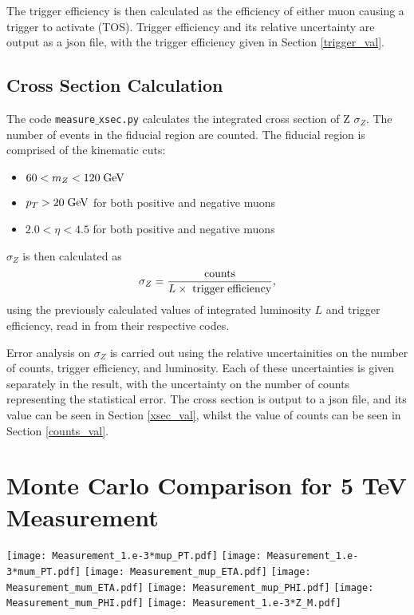 \documentclass[a4paper]{article}
\begin{document}
The trigger efficiency is then calculated as the efficiency of either muon causing a trigger to activate (TOS).
Trigger efficiency and its relative uncertainty are output as a json file, with the trigger efficiency given in Section \ref{trigger_val}.

\subsection{Cross Section Calculation}
The code \texttt{measure$\_$xsec.py} calculates the integrated cross section of Z $\sigma_Z$.
The number of events in the fiducial region are counted. The fiducial region is comprised of the kinematic cuts:

\begin{itemize}
  \item $60 < m_Z < 120 \; {\rm GeV}$ 
  \item $p_T > 20 \; {\rm GeV}$ for both positive and negative muons
  \item $2.0 < \eta < 4.5$ for both positive and negative muons
\end{itemize}

$\sigma_Z$ is then calculated as
\begin{equation}
\sigma_Z = \frac{{\rm counts}}{L \times {\rm \; trigger \; efficiency}},
\end{equation}
using the previously calculated values of integrated luminosity $L$ and trigger efficiency, read in from their respective codes.

Error analysis on $\sigma_Z$ is carried out using the relative uncertainities on the number of counts, trigger efficiency, and luminosity. Each of these uncertainties is given separately in the result, with the uncertainty on the number of counts representing the statistical error. The cross section is output to a json file, and its value can be seen in Section \ref{xsec_val}, whilst the value of counts can be seen in Section \ref{counts_val}.

\section{Monte Carlo Comparison for 5 TeV Measurement} \label{histograms}

\texttt{[image: Measurement\_1.e-3*mup\_PT.pdf]}
\texttt{[image: Measurement\_1.e-3*mum\_PT.pdf]}
\texttt{[image: Measurement\_mup\_ETA.pdf]}
\texttt{[image: Measurement\_mum\_ETA.pdf]}
\texttt{[image: Measurement\_mup\_PHI.pdf]}
\texttt{[image: Measurement\_mum\_PHI.pdf]}
\texttt{[image: Measurement\_1.e-3*Z\_M.pdf]}




{}

\end{document}
